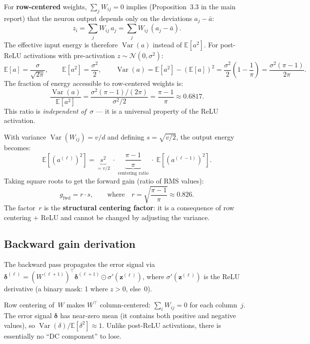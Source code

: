 \documentclass[11pt,a4paper]{article}
\theoremstyle{definition}
\newcommand{\E}{\mathbb{E}}
\newcommand{\Var}{\operatorname{Var}}
\begin{document}
For \textbf{row-centered} weights, $\sum_j W_{ij} = 0$ implies
(Proposition~3.3 in the main report) that the neuron output
depends only on the deviations $a_j - \bar{a}$:
\[
  z_i = \sum_j W_{ij}\,a_j = \sum_j W_{ij}\,(a_j - \bar{a}).
\]
The effective input energy is therefore $\Var(a)$ instead of
$\E[a^2]$.  For post-ReLU activations with pre-activation
$z \sim \mathcal{N}(0, \sigma^2)$:
\begin{equation}\label{eq:half-gauss}
  \E[a] = \frac{\sigma}{\sqrt{2\pi}}, \qquad
  \E[a^2] = \frac{\sigma^2}{2}, \qquad
  \Var(a) = \E[a^2] - (\E[a])^2 = \frac{\sigma^2}{2}\left(1 - \frac{1}{\pi}\right)
           = \frac{\sigma^2(\pi-1)}{2\pi}.
\end{equation}
The fraction of energy accessible to row-centered weights is:
\begin{equation}\label{eq:centering-ratio}
  \frac{\Var(a)}{\E[a^2]}
  = \frac{\sigma^2(\pi-1)/(2\pi)}{\sigma^2/2}
  = \frac{\pi-1}{\pi} \approx 0.6817.
\end{equation}
This ratio is \emph{independent of~$\sigma$} --- it is a universal
property of the ReLU activation.

With variance $\Var(W_{ij}) = v/d$ and defining $s = \sqrt{v/2}$,
the output energy becomes:
\[
  \E[(a^{(\ell)})^2]
  = \underbrace{s^2}_{= v/2}
    \;\cdot\; \underbrace{\frac{\pi-1}{\pi}}_{\text{centering ratio}}
    \;\cdot\; \E[(a^{(\ell-1)})^2].
\]
Taking square roots to get the forward gain (ratio of RMS values):
\begin{equation}\label{eq:fwd-gain}
  \boxed{\;g_{\mathrm{fwd}} = r \cdot s,
  \qquad\text{where}\quad r = \sqrt{\frac{\pi-1}{\pi}} \approx 0.826.\;}
\end{equation}
The factor~$r$ is the \textbf{structural centering factor}: it is a
consequence of row centering + ReLU and cannot be changed by
adjusting the variance.

\subsection{Backward gain derivation}
\label{sec:bwd-derivation}

The backward pass propagates the error signal via
$\bm{\delta}^{(\ell)} = (W^{(\ell+1)})^\top \bm{\delta}^{(\ell+1)}
\odot \sigma'(\bm{z}^{(\ell)})$,
where $\sigma'(\bm{z}^{(\ell)})$ is the ReLU derivative
(a binary mask: 1 where $z > 0$, else~0).

Row centering of~$W$ makes $W^\top$ column-centered:
$\sum_i W_{ij} = 0$ for each column~$j$.  The error signal
$\bm{\delta}$ has near-zero mean (it contains both positive
and negative values), so
$\Var(\delta)/\E[\delta^2] \approx 1$.  Unlike post-ReLU
activations, there is essentially no ``DC component'' to lose.
\end{document}
